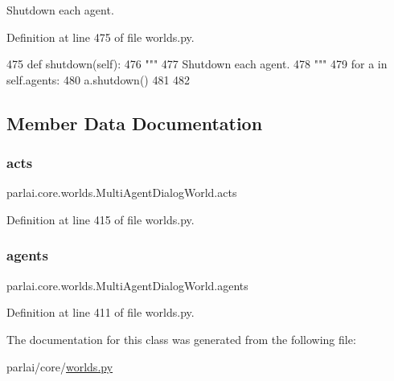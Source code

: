 \begin{DoxyVerb}Shutdown each agent.
\end{DoxyVerb}
 

Definition at line 475 of file worlds.\+py.


\begin{DoxyCode}
475     \textcolor{keyword}{def }shutdown(self):
476         \textcolor{stringliteral}{"""}
477 \textcolor{stringliteral}{        Shutdown each agent.}
478 \textcolor{stringliteral}{        """}
479         \textcolor{keywordflow}{for} a \textcolor{keywordflow}{in} self.agents:
480             a.shutdown()
481 
482 
\end{DoxyCode}


\subsection{Member Data Documentation}
\mbox{\label{classparlai_1_1core_1_1worlds_1_1MultiAgentDialogWorld_a99b292b010250515b1690aeb03cf614b}} 
\subsubsection{\texorpdfstring{acts}{acts}}
{\footnotesize\ttfamily parlai.\+core.\+worlds.\+Multi\+Agent\+Dialog\+World.\+acts}



Definition at line 415 of file worlds.\+py.

\mbox{\label{classparlai_1_1core_1_1worlds_1_1MultiAgentDialogWorld_a05fc93525cb86edef121980fc55f9926}} 
\subsubsection{\texorpdfstring{agents}{agents}}
{\footnotesize\ttfamily parlai.\+core.\+worlds.\+Multi\+Agent\+Dialog\+World.\+agents}



Definition at line 411 of file worlds.\+py.



The documentation for this class was generated from the following file\+:\begin{DoxyCompactItemize}
\item 
parlai/core/\hyperlink{parlai_2core_2worlds_8py}{worlds.\+py}\end{DoxyCompactItemize}
